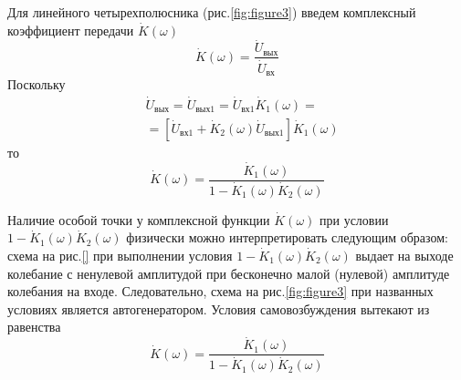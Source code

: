 Для линейного четырехполюсника (рис.\ref{fig:figure3}) введем комплексный коэффициент передачи $\dot{K}(\omega)$
\begin{equation*}
\dot{K}(\omega)=\frac{\dot{U}_\text{вых}}{\dot{U}_\text{вх}}
\end{equation*}
Поскольку
\begin{equation*}
\begin{aligned}
&\dot{U}_\text{вых}=\dot{U}_{\text{вых}1}=\dot{U}_{\text{вх}1}\dot{K}_1(\omega)=\\
&= [\dot{U}_{\text{вх}1}+\dot{K}_2(\omega)\dot{U}_{\text{вых}1}]\dot{K}_1(\omega)
\end{aligned}
\end{equation*}
то 
\begin{equation*}
\dot{K}(\omega)=\frac{\dot{K}_1(\omega)}{1-\dot{K}_1(\omega)\dot{K}_2(\omega)}
\end{equation*}

Наличие особой точки у комплексной функции $\dot{K}(\omega)$ при условии $1-\dot{K}_1(\omega)\dot{K}_2(\omega)$ физически можно интерпретировать следующим образом: схема на рис.\ref{} при выполнении условия $1-\dot{K}_1(\omega)\dot{K}_2(\omega)$ выдает на выходе колебание с ненулевой амплитудой при бесконечно малой (нулевой) амплитуде колебания на входе. Следовательно, схема  на рис.\ref{fig:figure3} при названных условиях является автогенератором.
Условия самовозбуждения вытекают из равенства
\begin{equation*}
\dot{K}(\omega)=\frac{\dot{K}_1(\omega)}{1-\dot{K}_1(\omega)\dot{K}_2(\omega)}
\end{equation*}

